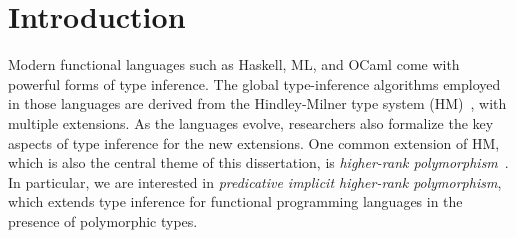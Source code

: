 \chapter{Introduction}


Modern functional languages such as Haskell, ML, and OCaml come with powerful
forms of type inference. The global type-inference algorithms employed in those
languages are derived from the Hindley-Milner type system (HM)~\citep{hindley,
  Damas:Milner}, with multiple extensions. As the languages evolve, researchers
also formalize the key aspects of type inference for the new extensions. One
common extension of HM, which is also the central theme of this dissertation, is
\emph{higher-rank polymorphism}~\citep{odersky:putting,practical:inference,
  DK}. In particular, we are interested in \textit{predicative implicit
  higher-rank polymorphism}, which extends type inference for functional
programming languages in the presence of polymorphic types.







\noindent\makebox[\linewidth]{\rule{0.7\textwidth}{0.4pt}}

\vspace{1.5\baselineskip}



